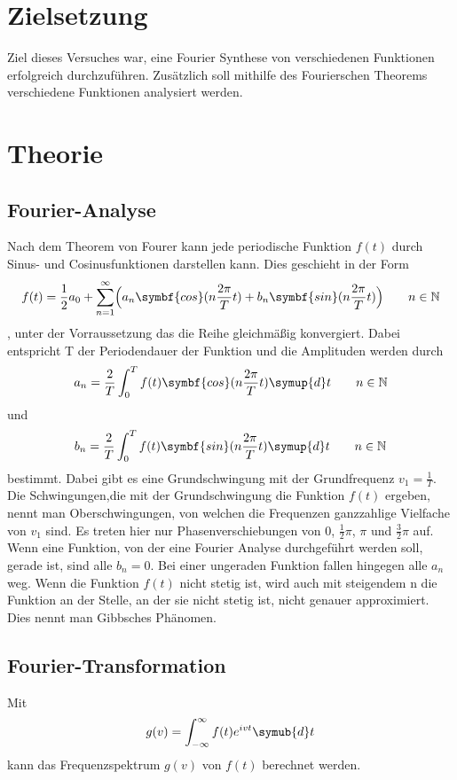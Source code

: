 \section{Zielsetzung}
\label{sec:Zielsetzung}
Ziel dieses Versuches war, eine Fourier Synthese von verschiedenen Funktionen erfolgreich durchzuführen.
Zusätzlich soll mithilfe des Fourierschen Theorems verschiedene Funktionen analysiert werden.

\section{Theorie}
\label{sec:Theorie}
\subsection{Fourier-Analyse}
Nach dem Theorem von Fourer kann jede periodische Funktion $f(t)$ durch Sinus- und Cosinusfunktionen darstellen kann.
Dies geschieht in der Form 
\begin{equation}
    f(t)=\frac{1}{2}a_0+\sum_{n=1}^{\infty}\Bigl(a_n \symbf{cos}(n \frac{2 \pi}{T} t) + b_n \symbf{sin}(n \frac{2\pi}{T}t)\Bigr) \qquad n\in\mathbb{N}
    \label{eqn:f_reihe}
\end{equation}, unter der Vorraussetzung das die Reihe gleichmäßig konvergiert.
Dabei entspricht T der Periodendauer der Funktion und die Amplituden werden durch
\begin{equation}
    a_n=\frac{2}{T}\int_0^T f(t) \symbf{cos}(n \frac{2\pi}{T}t) \symup{d}t \qquad n\in\mathbb{N}
    \label{eqn:a_n}
\end{equation}
und 
\begin{equation}
    b_n=\frac{2}{T}\int_0^T f(t) \symbf{sin}(n \frac{2\pi}{T}t) \symup{d}t \qquad n\in\mathbb{N}
    \label{eqn:b_n}
\end{equation}
bestimmt.
Dabei gibt es eine Grundschwingung mit der Grundfrequenz $v_1=\frac{1}{T}$.
Die Schwingungen,die mit der Grundschwingung die Funktion $f(t)$ ergeben, nennt man Oberschwingungen, von welchen die Frequenzen ganzzahlige Vielfache von $v_1$ sind.
Es treten hier nur Phasenverschiebungen von 0, $\frac{1}{2}\pi$, $\pi$ und $\frac{3}{2}\pi$ auf.
Wenn eine Funktion, von der eine Fourier Analyse durchgeführt werden soll, gerade ist, sind alle $b_n=0$.
Bei einer ungeraden Funktion fallen hingegen alle $a_n$ weg.
Wenn die Funktion $f(t)$ nicht stetig ist, wird auch mit steigendem n die Funktion an der Stelle, an der sie nicht stetig ist, nicht genauer approximiert.
Dies nennt man Gibbsches Phänomen.

\subsection{Fourier-Transformation}
Mit
\begin{equation}
    g(v)=\int_{-\infty}^{\infty}f(t)e^{ivt} \symub{d}t
    \label{eqn:trafo}
\end{equation}
kann das Frequenzspektrum $g(v)$ von $f(t)$ berechnet werden.%
\cite{sample}
